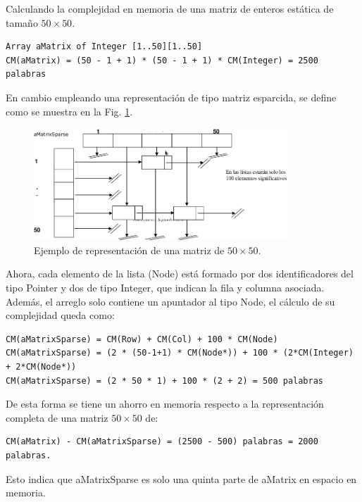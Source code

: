 Calculando la complejidad en memoria de una matriz de enteros estática de tamaño $50 \times 50$.
\begin{lstlisting}[upquote=true, language=pseudo]
Array aMatrix of Integer [1..50][1..50]
CM(aMatrix) = (50 - 1 + 1) * (50 - 1 + 1) * CM(Integer) = 2500 palabras
\end{lstlisting}

En cambio empleando una representación de tipo matriz esparcida, se define como se muestra en la Fig. \ref{fig:sparse}.

\begin{figure}[htp!]
  \begin{center}
    \includegraphics[width=0.85\textwidth]{images/sparse.png}
  \end{center}
  \caption{Ejemplo de representación de una matriz de $50 \times 50$.}
  \label{fig:sparse}
\end{figure}

Ahora, cada elemento de la lista (Node) está formado por dos identificadores del tipo Pointer y dos de tipo Integer, que indican la fila y columna asociada. Además, el arreglo solo contiene un apuntador al tipo Node, el cálculo de su complejidad queda como:
\begin{lstlisting}[upquote=true, language=pseudo]
CM(aMatrixSparse) = CM(Row) + CM(Col) + 100 * CM(Node)
CM(aMatrixSparse) = (2 * (50-1+1) * CM(Node*)) + 100 * (2*CM(Integer) + 2*CM(Node*))
CM(aMatrixSparse) = (2 * 50 * 1) + 100 * (2 + 2) = 500 palabras
\end{lstlisting}

De esta forma se tiene un ahorro en memoria respecto a la representación completa de una matriz $50 \times 50$ de: 
\begin{lstlisting}[upquote=true, language=pseudo]
CM(aMatrix) - CM(aMatrixSparse) = (2500 - 500) palabras = 2000 palabras. 
\end{lstlisting}

Esto indica que aMatrixSparse es solo una quinta parte de aMatrix en espacio en memoria.

